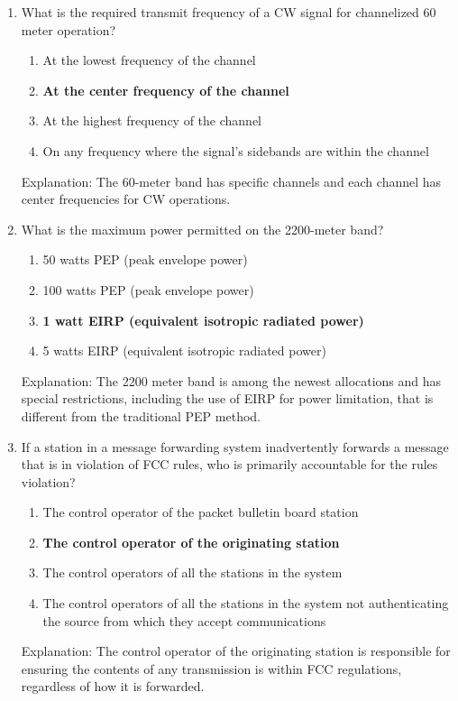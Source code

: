 \begin{enumerate}
    \item What is the required transmit frequency of a CW signal for channelized 60 meter operation?
    \begin{enumerate}
        \item At the lowest frequency of the channel
        \item \textbf {At the center frequency of the channel}
        \item  At the highest frequency of the channel
        \item  On any frequency where the signal's sidebands are within the channel
    \end{enumerate}
     \textcolor{myred}{Explanation:}
    The 60-meter band has specific channels and each channel has center frequencies for CW operations.

    \item What is the maximum power permitted on the 2200-meter band?
    \begin{enumerate}
        \item 50 watts PEP (peak envelope power)
        \item  100 watts PEP (peak envelope power)
         \item \textbf {1 watt EIRP (equivalent isotropic radiated power)}
        \item  5 watts EIRP (equivalent isotropic radiated power)
    \end{enumerate}
    \textcolor{myred}{Explanation:}
     The 2200 meter band is among the newest allocations and has special restrictions, including the use of EIRP for power limitation, that is different from the traditional PEP method.

      \item If a station in a message forwarding system inadvertently forwards a message that is in violation of FCC rules, who is primarily accountable for the rules violation?
    \begin{enumerate}
        \item The control operator of the packet bulletin board station
        \item \textbf {The control operator of the originating station}
        \item  The control operators of all the stations in the system
        \item  The control operators of all the stations in the system not authenticating the source from which they accept communications
    \end{enumerate}
      \textcolor{myred}{Explanation:}
     The control operator of the originating station is responsible for ensuring the contents of any transmission is within FCC regulations, regardless of how it is forwarded.
       

\end{enumerate}
